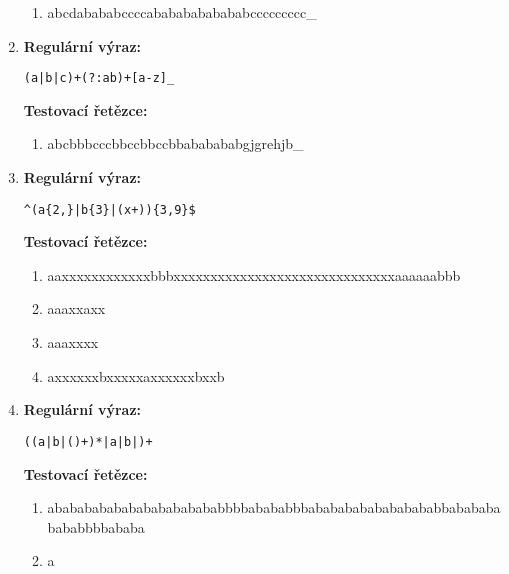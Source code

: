 \documentclass[czech,bachelor]{diploma}
\begin{document}
\begin{enumerate}
    \begin{enumerate}
        \item abcdabababccccabababababababccccccccc\_ \setlength\parindent{1em} \textcolor{OliveGreen}{\Checkmark} \label{itm:TD_3a}
    \end{enumerate}


    \item 
    \noindent\textbf{Regulární výraz:} 

    \texttt{(a|b|c)+(?:ab)+[a-z]\_}

    \noindent\textbf{Testovací řetězce:}

    \begin{enumerate}
        \item abcbbbcccbbccbbccbbababababgjgrehjb\_ \setlength\parindent{1em} \textcolor{Red}{\XSolid} \label{itm:TD_4a}
    \end{enumerate}


    \item 
    \noindent\textbf{Regulární výraz:} 

    \texttt{\textasciicircum (a\{2,\}|b\{3\}|(x+))\{3,9\}\$}

    \noindent\textbf{Testovací řetězce:}

    \begin{enumerate}
        \item aaxxxxxxxxxxxxbbbxxxxxxxxxxxxxxxxxxxxxxxxxxxxxxaaaaaabbb \setlength\parindent{1em} \textcolor{OliveGreen}{\Checkmark} \label{itm:TD_5a}
        \item aaaxxaxx \setlength\parindent{1em} \textcolor{Red}{\XSolid}
        \item aaaxxxx \setlength\parindent{1em} \textcolor{OliveGreen}{\Checkmark}
        \item axxxxxxbxxxxxaxxxxxxbxxb \setlength\parindent{1em} \textcolor{Red}{\XSolid}
    \end{enumerate}


    \item 
    \noindent\textbf{Regulární výraz:} 
    
    \texttt{((a|b|()+)*|a|b|)+}

    \noindent\textbf{Testovací řetězce:}

    \begin{enumerate}
        \item \parbox[t]{14cm}{ababababababababababababbbbabababbbabababababababababbababababababbbbab\-aba \setlength\parindent{1em} \textcolor{OliveGreen}{\Checkmark}} \label{itm:TD_6a}
        \item a \setlength\parindent{1em} \textcolor{OliveGreen}{\Checkmark}
    \end{enumerate}



\end{enumerate}
\end{document}
